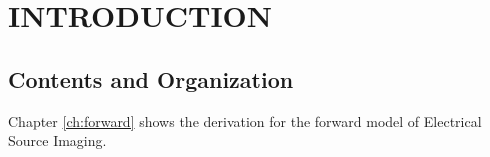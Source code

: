 \chapter{INTRODUCTION}
\label{ch:intro}

\section{Contents and Organization}

Chapter \ref{ch:forward} shows the derivation for the forward model of Electrical Source Imaging.
%
